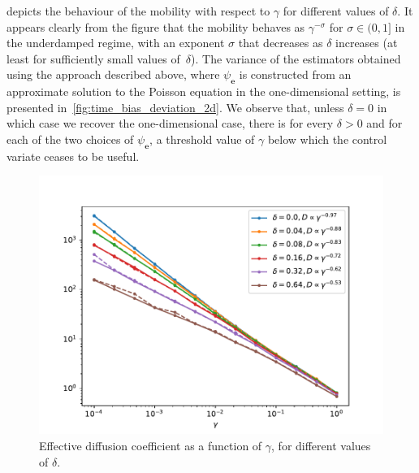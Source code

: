 \documentclass[11pt,a4paper]{article}
\newcommand{\vect}[1]{\boldsymbol{\mathbf #1}}
\theoremstyle{plain}
\numberwithin{equation}{section}
\begin{document}
 depicts the behaviour of the mobility with respect to $\gamma$ for different values of $\delta$.
It appears clearly from the figure that the mobility behaves as $\gamma^{-\sigma}$ for $\sigma \in (0, 1]$ in the underdamped regime,
with an exponent $\sigma$ that decreases as $\delta$ increases (at least for sufficiently small values of~$\delta$).
The variance of the estimators obtained using the approach described above,
where $\psi_{\vect e}$ is constructed from an approximate solution to the Poisson equation in the one-dimensional setting,
is presented in~\cref{fig:time_bias_deviation_2d}.
We observe that, unless $\delta = 0$ in which case we recover the one-dimensional case,
there is for every $\delta > 0$ and for each of the two choices of $\psi_{\vect e}$,
a threshold value of $\gamma$ below which the control variate ceases to be useful.

\begin{figure}[ht]
    \centering
    \includegraphics[width=0.99\linewidth]{figures/diffusion.pdf}
    \caption{
        Effective diffusion coefficient as a function of $\gamma$,
        for different values of $\delta$.
    }%
    \label{fig:time_bias_variance_2d}
\end{figure}
\end{document}
